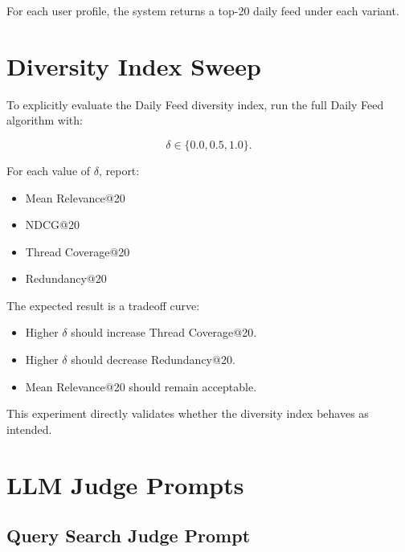 \documentclass[11pt]{article}
\begin{document}
For each user profile, the system returns a top-20 daily feed under each variant.

\section{Diversity Index Sweep}

To explicitly evaluate the Daily Feed diversity index, run the full Daily Feed algorithm with:

\[
\delta \in \{0.0, 0.5, 1.0\}.
\]

For each value of $\delta$, report:

\begin{itemize}[leftmargin=*]
    \item Mean Relevance@20
    \item NDCG@20
    \item Thread Coverage@20
    \item Redundancy@20
\end{itemize}

The expected result is a tradeoff curve:

\begin{itemize}[leftmargin=*]
    \item Higher $\delta$ should increase Thread Coverage@20.
    \item Higher $\delta$ should decrease Redundancy@20.
    \item Mean Relevance@20 should remain acceptable.
\end{itemize}

This experiment directly validates whether the diversity index behaves as intended.

\section{LLM Judge Prompts}

\subsection{Query Search Judge Prompt}
\end{document}
